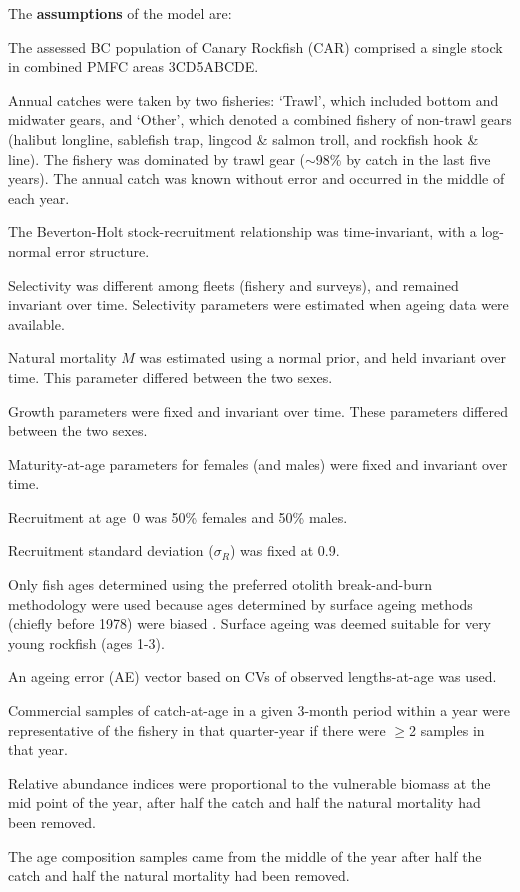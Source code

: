 \documentclass[11pt]{book}
\newcommand{\pc}{\%}
\begin{document}
The \textbf{assumptions} of the model are:
\begin{enumerate_csas}{}{}
\item The assessed BC population of Canary Rockfish (CAR) comprised  a single stock in combined PMFC areas 3CD5ABCDE.
\item Annual catches were taken by two fisheries: `Trawl', which included bottom and midwater gears, and `Other', which denoted a combined fishery of non-trawl gears (halibut longline, sablefish trap, lingcod \& salmon troll, and rockfish hook \& line). The \spc{} fishery was dominated by trawl gear ($\sim$98\pc{} by catch in the last five years). The annual catch was known without error and occurred in the middle of each year.
\item The Beverton-Holt stock-recruitment relationship was time-invariant, with a log-normal error structure.
\item Selectivity was different among fleets (fishery and surveys), and remained invariant over time. Selectivity parameters were estimated when ageing data were available.
\item Natural mortality $M$ was estimated using a normal prior, and held invariant over time. This parameter differed between the two sexes.
\item Growth parameters were fixed and invariant over time. These parameters differed between the two sexes.
\item Maturity-at-age parameters for females (and males) were fixed and invariant over time.
\item Recruitment at age~0 was 50\pc{} females and 50\pc{} males.
\item Recruitment standard deviation ($\sigma_R$) was fixed at 0.9.
\item Only fish ages determined using the preferred otolith break-and-burn methodology \citep{MacLellan:1997} were used because ages determined by surface ageing methods (chiefly before 1978) were biased \citep{Beamish:1979}. Surface ageing was deemed suitable for very young rockfish (ages 1-3).
\item An ageing error (AE) vector based on CVs of observed lengths-at-age was used.
\item Commercial samples of catch-at-age in a given 3-month period within a year were representative of the fishery in that quarter-year if there were $\geq$2 samples in that year.
\item Relative abundance indices were proportional to the vulnerable biomass at the mid point of the year, after half the catch and half the natural mortality had been removed.
\item The age composition samples came from the middle of the year after half the catch and half the natural mortality had been removed.
\end{enumerate_csas}
\end{document}
